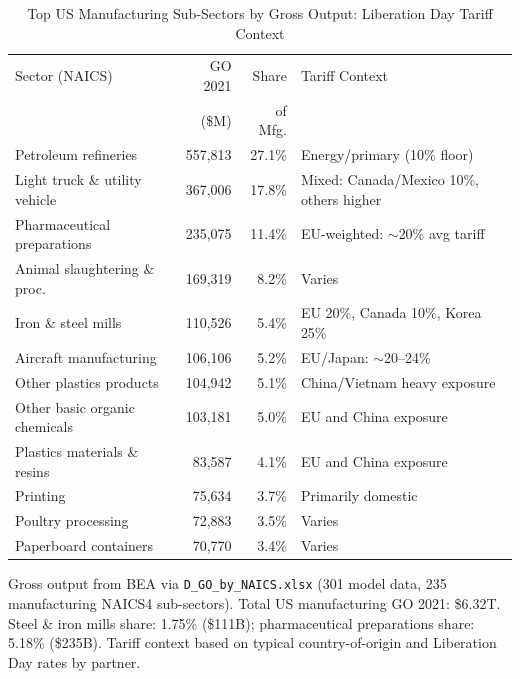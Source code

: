 \documentclass[12pt]{article}
\begin{document}
\begin{threeparttable}
\begin{table}[H]
\centering
\caption{Top US Manufacturing Sub-Sectors by Gross Output: Liberation Day Tariff Context}
\label{tab:manufacturing_naics}
\begin{tabular}{p{4.5cm}rrl}
\toprule
Sector (NAICS) & GO 2021 & Share & Tariff Context \\
               & (\$M)   & of Mfg. & \\
\midrule
Petroleum refineries          & 557,813 & 27.1\% & Energy/primary (10\% floor) \\
Light truck \& utility vehicle & 367,006 & 17.8\% & Mixed: Canada/Mexico 10\%, others higher \\
Pharmaceutical preparations   & 235,075 & 11.4\% & EU-weighted: $\sim$20\% avg tariff \\
Animal slaughtering \& proc.  & 169,319 &  8.2\% & Varies \\
Iron \& steel mills           & 110,526 &  5.4\% & EU 20\%, Canada 10\%, Korea 25\% \\
Aircraft manufacturing        & 106,106 &  5.2\% & EU/Japan: $\sim$20--24\% \\
Other plastics products       & 104,942 &  5.1\% & China/Vietnam heavy exposure \\
Other basic organic chemicals & 103,181 &  5.0\% & EU and China exposure \\
Plastics materials \& resins  &  83,587 &  4.1\% & EU and China exposure \\
Printing                      &  75,634 &  3.7\% & Primarily domestic \\
Poultry processing            &  72,883 &  3.5\% & Varies \\
Paperboard containers         &  70,770 &  3.4\% & Varies \\
\bottomrule
\end{tabular}
\begin{tablenotes}
\small
\item Gross output from BEA via \texttt{D\_GO\_by\_NAICS.xlsx} (301 model data,
235 manufacturing NAICS4 sub-sectors). Total US manufacturing GO 2021: \$6.32T.
Steel \& iron mills share: 1.75\% (\$111B); pharmaceutical preparations share:
5.18\% (\$235B). Tariff context based on typical country-of-origin and Liberation
Day rates by partner.
\end{tablenotes}
\end{table}
\end{threeparttable}
\end{document}
